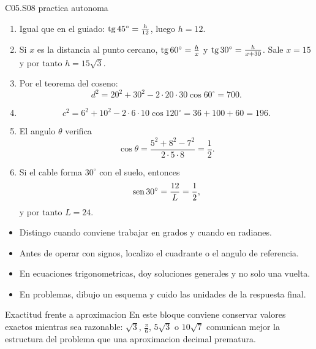 \begin{fullsolution}{C05.S08 practica autonoma}
\begin{enumerate}[label=\textbf{PX-C05.S08-\arabic*:}, leftmargin=*]
  \item Igual que en el guiado: \(\operatorname{tg} 45^\circ=\frac{h}{12}\), luego \(h=12\).
  \item Si \(x\) es la distancia al punto cercano, \(\operatorname{tg} 60^\circ=\frac{h}{x}\) y
  \(\operatorname{tg} 30^\circ=\frac{h}{x+30}\). Sale \(x=15\) y por tanto \(h=15\sqrt{3}\).
  \item Por el teorema del coseno:
  \[
  d^2=20^2+30^2-2\cdot 20\cdot 30\cos 60^\circ=700.
  \]
  \item
  \[
  c^2=6^2+10^2-2\cdot 6\cdot 10\cos 120^\circ=36+100+60=196.
  \]
  \item El angulo \(\theta\) verifica
  \[
  \cos\theta=\frac{5^2+8^2-7^2}{2\cdot 5\cdot 8}=\frac{1}{2}.
  \]
  \item Si el cable forma \(30^\circ\) con el suelo, entonces
  \[
  \operatorname{sen} 30^\circ=\frac{12}{L}=\frac{1}{2},
  \]
  y por tanto \(L=24\).
\end{enumerate}
\end{fullsolution}

\begin{selfcheck}
\begin{itemize}
  \item Distingo cuando conviene trabajar en grados y cuando en radianes.
  \item Antes de operar con signos, localizo el cuadrante o el angulo de referencia.
  \item En ecuaciones trigonometricas, doy soluciones generales y no solo una vuelta.
  \item En problemas, dibujo un esquema y cuido las unidades de la respuesta final.
\end{itemize}
\end{selfcheck}

\begin{extension}{Exactitud frente a aproximacion}
En este bloque conviene conservar valores exactos mientras sea razonable: \(\sqrt{3}\),
\(\frac{\pi}{6}\), \(5\sqrt{3}\) o \(10\sqrt{7}\) comunican mejor la estructura del problema
que una aproximacion decimal prematura.
\end{extension}
